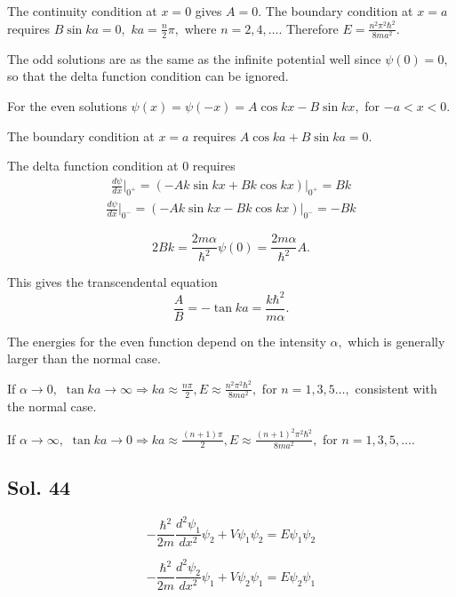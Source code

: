     
    The continuity condition at $x=0$ gives $A=0.$
    The boundary condition at $x=a$ requires $B\sin ka=0,$ $ka=\frac{n}{2}\pi,$ where $n=2,4,\dots.$ Therefore $E=\frac{n^2\pi^2\hbar^2}{8ma^2}.$
    
    The odd solutions are as the same as the infinite potential well since $\psi(0)=0,$ so that the delta function condition can be ignored.


    For the even solutions  $\psi(x)=\psi(-x)
    =A\cos kx-B\sin kx,$ for $-a<x<0.$

    The boundary condition at $x=a$ requires $A\cos ka+B\sin ka=0.$ 

    The delta function condition at $0$ requires
    \begin{align*}
        \frac{d\psi}{dx}\bigg|_{0^+} = (-Ak\sin kx + Bk\cos kx)|_{0^+} = Bk
    \end{align*}
    \begin{align*}
        \frac{d\psi}{dx}\bigg|_{0^-} =  (-Ak\sin kx - Bk\cos kx)|_{0^-} = -Bk
    \end{align*}

    $$
    2Bk=\frac{2m\alpha}{\hbar^2}\psi(0)=\frac{2m\alpha}{\hbar^2}A.
    $$

    This gives the transcendental equation 
    $$
    \frac{A}{B}=-\tan ka = \frac{k\hbar^2}{m\alpha}.
    $$

    
    The energies for the even function depend on the intensity $\alpha,$ which is generally larger than the normal case.
    
    If $\alpha\to 0,$ $\tan ka\to \infty \Rightarrow 
    ka\approx\frac{n\pi}{2},
    E\approx\frac{n^2\pi^2\hbar^2}{8ma^2},
    $
    for $n=1,3,5\dots,$ consistent with the normal case.

    If $\alpha\to \infty,$ $\tan ka\to 0 \Rightarrow 
    ka\approx \frac{(n+1)\pi}{2},
    E\approx\frac{(n+1)^2\pi^2\hbar^2}{8ma^2},
    $ for $n=1,3,5,\dots.$ 
    

    
    
    

    \subsection*{Sol. 44}
    $$
    -\frac{\hbar^2}{2m}
    \frac{d^2\psi_1}{dx^2}\psi_2+
    V\psi_1\psi_2 = E\psi_1\psi_2
    $$

    $$
    -\frac{\hbar^2}{2m}
    \frac{d^2\psi_2}{dx^2}\psi_1+
    V\psi_2\psi_1 = E\psi_2\psi_1
    $$

